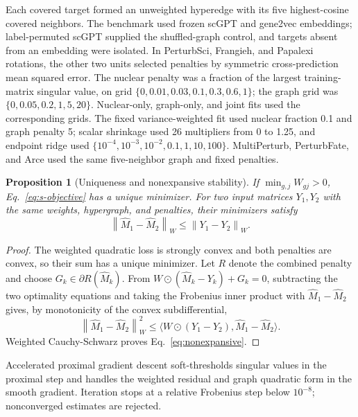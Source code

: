\documentclass[10pt,a4paper]{article}
\newtheorem{proposition}{Proposition}
\newcommand{\norm}[1]{\left\lVert#1\right\rVert}
\begin{document}
Each covered target formed an unweighted hyperedge with its five highest-cosine covered neighbors. The benchmark used frozen scGPT and gene2vec embeddings; label-permuted scGPT supplied the shuffled-graph control, and targets absent from an embedding were isolated. In PerturbSci, Frangieh, and Papalexi rotations, the other two units selected penalties by symmetric cross-prediction mean squared error. The nuclear penalty was a fraction of the largest training-matrix singular value, on grid $\{0,0.01,0.03,0.1,0.3,0.6,1\}$; the graph grid was $\{0,0.05,0.2,1,5,20\}$. Nuclear-only, graph-only, and joint fits used the corresponding grids. The fixed variance-weighted fit used nuclear fraction 0.1 and graph penalty 5; scalar shrinkage used 26 multipliers from 0 to 1.25, and endpoint ridge used $\{10^{-4},10^{-3},10^{-2},0.1,1,10,100\}$. MultiPerturb, PerturbFate, and Arce used the same five-neighbor graph and fixed penalties.

\begin{proposition}[Uniqueness and nonexpansive stability]
If $\min_{g,j}W_{gj}>0$, Eq.~\eqref{eq:s-objective} has a unique minimizer. For two input matrices $Y_1,Y_2$ with the same weights, hypergraph, and penalties, their minimizers satisfy
\begin{equation}
  \norm{\widehat M_1-\widehat M_2}_W
  \le \norm{Y_1-Y_2}_W.
  \label{eq:nonexpansive}
\end{equation}
\end{proposition}

\begin{proof}
The weighted quadratic loss is strongly convex and both penalties are convex, so their sum has a unique minimizer. Let $R$ denote the combined penalty and choose $G_k\in\partial R(\widehat M_k)$. From $W\odot(\widehat M_k-Y_k)+G_k=0$, subtracting the two optimality equations and taking the Frobenius inner product with $\widehat M_1-\widehat M_2$ gives, by monotonicity of the convex subdifferential,
\[
\norm{\widehat M_1-\widehat M_2}_W^2
\le \langle W\odot(Y_1-Y_2),\widehat M_1-\widehat M_2\rangle.
\]
Weighted Cauchy-Schwarz proves Eq.~\eqref{eq:nonexpansive}.
\end{proof}

Accelerated proximal gradient descent soft-thresholds singular values in the proximal step and handles the weighted residual and graph quadratic form in the smooth gradient. Iteration stops at a relative Frobenius step below $10^{-8}$; nonconverged estimates are rejected.

\FloatBarrier
{}
\end{document}

